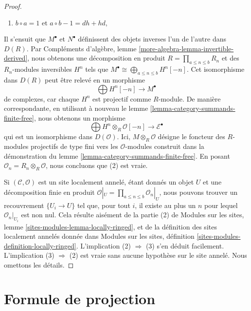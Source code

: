 \begin{proof}
\begin{enumerate}
\item $b \circ a = 1$ et $a \circ b - 1 = dh + hd$,
\end{enumerate}
Il s'ensuit que $M^\bullet$ et $N^\bullet$ définissent des objets inverses
l'un de l'autre dans $D(R)$. Par Compléments d'algèbre, lemme
\ref{more-algebra-lemma-invertible-derived}, nous obtenons une décomposition
en produit $R = \prod_{a \leq n \leq b} R_n$ et des $R_n$-modules inversibles
$H^n$ tels que
$M^\bullet \cong \bigoplus_{a \leq n \leq b} H^n[-n]$. Cet isomorphisme dans
$D(R)$ peut être relevé en un morphisme
$$
\bigoplus H^n[-n] \longrightarrow M^\bullet
$$
de complexes, car chaque $H^n$ est projectif comme $R$-module. De manière
correspondante, en utilisant à nouveau le lemme
\ref{lemma-category-summands-finite-free}, nous obtenons un morphisme
$$
\bigoplus H^n \otimes_R \mathcal{O}[-n] \to \mathcal{E}^\bullet
$$
qui est un isomorphisme dans $D(\mathcal{O})$. Ici,
$M \otimes_R \mathcal{O}$ désigne le foncteur des $R$-modules projectifs de
type fini vers les $\mathcal{O}$-modules construit dans la démonstration du
lemme \ref{lemma-category-summands-finite-free}. En posant
$\mathcal{O}_n = R_n \otimes_R \mathcal{O}$, nous concluons que (2) est vraie.

\medskip\noindent
Si $(\mathcal{C}, \mathcal{O})$ est un site localement annelé, étant donnés
un objet $U$ et une décomposition finie en produit
$\mathcal{O}|_U = \prod_{a \leq n \leq b} \mathcal{O}_n|_U$, nous pouvons
trouver un recouvrement $\{U_i \to U\}$ tel que, pour tout $i$, il existe au
plus un $n$ pour lequel $\mathcal{O}_n|_{U_i}$ est non nul. Cela résulte
aisément de la partie (2) de Modules sur les sites, lemme
\ref{sites-modules-lemma-locally-ringed}, et de la définition des sites
localement annelés donnée dans Modules sur les sites, définition
\ref{sites-modules-definition-locally-ringed}. L'implication
(2) $\Rightarrow$ (3) s'en déduit facilement. L'implication
(3) $\Rightarrow$ (2) est vraie sans aucune hypothèse sur le site annelé.
Nous omettons les détails.
\end{proof}










\section{Formule de projection}
\label{section-projection-formula}

